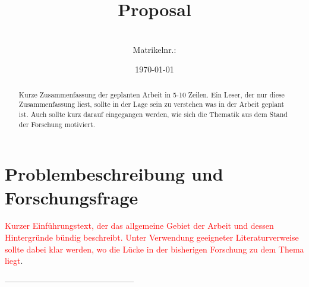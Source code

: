 \documentclass[ngerman, a4paper, abstract=false, twoside=false, parskip=half, DIV=12, bibtotoc]{scrartcl}
\title{Proposal}
\subtitle{\titel}
\author{\autor \\ {\small Matrikelnr.: \matrikelnr}}
\date{\today}
\begin{document}
\maketitle

\begin{abstract}%
Kurze Zusammenfassung der geplanten Arbeit in 5-10 Zeilen. Ein Leser, der nur diese Zusammenfassung liest, sollte in der Lage sein zu verstehen was in der Arbeit geplant ist. Auch sollte kurz darauf eingegangen werden, wie sich die Thematik aus dem Stand der Forschung motiviert.
\end{abstract}


\section{Problembeschreibung und Forschungsfrage}
\textcolor{red}{Kurzer Einführungstext, der das allgemeine Gebiet der Arbeit und dessen Hintergründe bündig beschreibt. Unter Verwendung geeigneter Literaturverweise sollte dabei klar werden, wo die Lücke in der bisherigen Forschung zu dem Thema liegt}.

-----------------------------------------------
\end{document}
